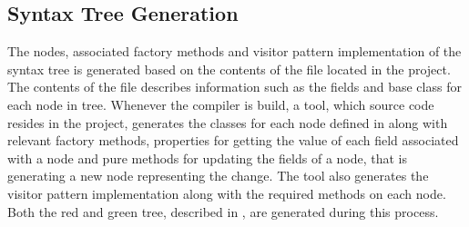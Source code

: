 \subsection{Syntax Tree Generation}
\label{subsec:roslyn_syntax_tree_generation}
The nodes, associated factory methods and visitor pattern implementation of the syntax tree is generated based on the contents of the  file located in the  project. The contents of the file describes information such as the fields and base class for each node in tree. Whenever the compiler is build, a tool, which source code resides in the  project, generates the classes for each node defined in  along with relevant factory methods, properties for getting the value of each field associated with a node and pure methods for updating the fields of a node, that is generating a new node representing the change. The tool also generates the visitor pattern implementation along with the required  methods on each node. Both the red and green tree, described in , are generated during this process. 


	
	


